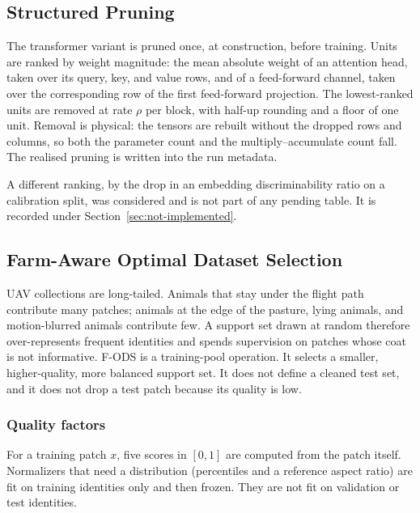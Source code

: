 \subsection{Structured Pruning}
\label{sec:pruning}

The transformer variant is pruned once, at construction, before training. Units are ranked by weight magnitude: the mean absolute weight of an attention head, taken over its query, key, and value rows, and of a feed-forward channel, taken over the corresponding row of the first feed-forward projection. The lowest-ranked units are removed at rate $\rho$ per block, with half-up rounding and a floor of one unit. Removal is physical: the tensors are rebuilt without the dropped rows and columns, so both the parameter count and the multiply--accumulate count fall. The realised pruning is written into the run metadata.

A different ranking, by the drop in an embedding discriminability ratio on a calibration split, was considered and is not part of any pending table. It is recorded under Section~\ref{sec:not-implemented}.

\subsection{Farm-Aware Optimal Dataset Selection}
\label{sec:fods}

UAV collections are long-tailed. Animals that stay under the flight path contribute many patches; animals at the edge of the pasture, lying animals, and motion-blurred animals contribute few. A support set drawn at random therefore over-represents frequent identities and spends supervision on patches whose coat is not informative. F-ODS is a training-pool operation. It selects a smaller, higher-quality, more balanced support set. It does not define a cleaned test set, and it does not drop a test patch because its quality is low.

\subsubsection{Quality factors}
\label{sec:quality}

For a training patch $x$, five scores in $[0,1]$ are computed from the patch itself. Normalizers that need a distribution (percentiles and a reference aspect ratio) are fit on training identities only and then frozen. They are not fit on validation or test identities.

